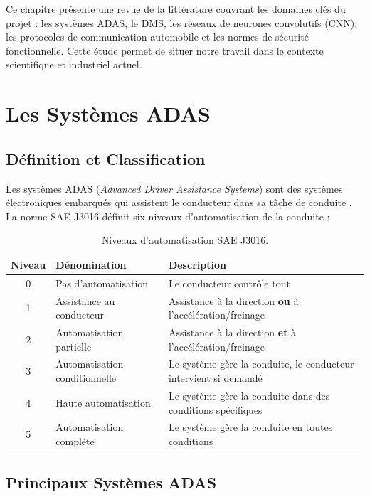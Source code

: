 \documentclass[12pt,a4paper,twoside]{report}
\begin{document}
Ce chapitre présente une revue de la littérature couvrant les domaines clés du projet : les systèmes ADAS, le DMS, les réseaux de neurones convolutifs (CNN), les protocoles de communication automobile et les normes de sécurité fonctionnelle. Cette étude permet de situer notre travail dans le contexte scientifique et industriel actuel.

\section{Les Systèmes ADAS}

\subsection{Définition et Classification}

Les systèmes ADAS (\textit{Advanced Driver Assistance Systems}) sont des systèmes électroniques embarqués qui assistent le conducteur dans sa tâche de conduite \cite{bengio2020}. La norme SAE J3016 \cite{sae2021} définit six niveaux d'automatisation de la conduite :

\begin{table}[H]
\centering
\caption{Niveaux d'automatisation SAE J3016.}
\label{tab:sae_levels}
\renewcommand{\arraystretch}{1.3}
\begin{tabularx}{\textwidth}{|c|l|X|}
\hline
\rowcolor{stellantisblue!15}
\textbf{Niveau} & \textbf{Dénomination} & \textbf{Description} \\
\hline
0 & Pas d'automatisation & Le conducteur contrôle tout \\
\hline
1 & Assistance au conducteur & Assistance à la direction \textbf{ou} à l'accélération/freinage \\
\hline
2 & Automatisation partielle & Assistance à la direction \textbf{et} à l'accélération/freinage \\
\hline
3 & Automatisation conditionnelle & Le système gère la conduite, le conducteur intervient si demandé \\
\hline
4 & Haute automatisation & Le système gère la conduite dans des conditions spécifiques \\
\hline
5 & Automatisation complète & Le système gère la conduite en toutes conditions \\
\hline
\end{tabularx}
\end{table}

\subsection{Principaux Systèmes ADAS}
\end{document}
